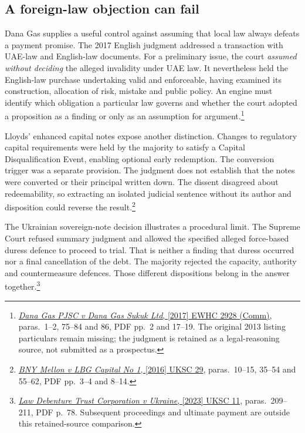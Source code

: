 \subsection{A foreign-law objection can fail}

Dana Gas supplies a useful control against assuming that local law always
defeats a payment promise. The 2017 English judgment addressed a transaction
with UAE-law and English-law documents. For a preliminary issue, the court
\emph{assumed without deciding} the alleged invalidity under UAE law.
It nevertheless held the English-law purchase undertaking valid and
enforceable, having examined its construction, allocation of risk, mistake
and public policy. An engine must identify which obligation a particular law
governs and whether the court adopted a proposition as a finding or only
as an assumption for argument.\footnote{
\href{../prospectus/corner-cases-2026-10-04/sources/jur-more-dana-judgment/source.pdf}
{\emph{Dana Gas PJSC v Dana Gas Sukuk Ltd}, [2017] EWHC 2928 (Comm)},
paras.~1--2, 75--84 and 86, PDF pp.~2 and 17--19.
The original 2013 listing particulars remain missing; the judgment is
retained as a legal-reasoning source, not submitted as a prospectus.}

Lloyds' enhanced capital notes expose another distinction. Changes to
regulatory capital requirements were held by the majority to satisfy a
Capital Disqualification Event, enabling optional early redemption.
The conversion trigger was a separate provision. The judgment does not
establish that the notes were converted or their principal written down.
The dissent disagreed about redeemability, so extracting an isolated
judicial sentence without its author and disposition could reverse the
result.\footnote{
\href{../prospectus/corner-cases-2026-10-04/sources/jur-more-lloyds-generated/source.pdf}
{\emph{BNY Mellon v LBG Capital No 1}, [2016] UKSC 29},
paras.~10--15, 35--54 and 55--62, PDF pp.~3--4 and 8--14.}

The Ukrainian sovereign-note decision illustrates a procedural limit.
The Supreme Court refused summary judgment and allowed the specified
alleged force-based duress defence to proceed to trial. That is neither
a finding that duress occurred nor a final cancellation of the debt.
The majority rejected the capacity, authority and countermeasure defences.
Those different dispositions belong in the answer together.\footnote{
\href{../prospectus/corner-cases-2026-10-04/sources/jur-more-ukraine-judgment/source.pdf}
{\emph{Law Debenture Trust Corporation v Ukraine}, [2023] UKSC 11},
paras.~209--211, PDF p.~78. Subsequent proceedings and ultimate payment
are outside this retained-source comparison.}

